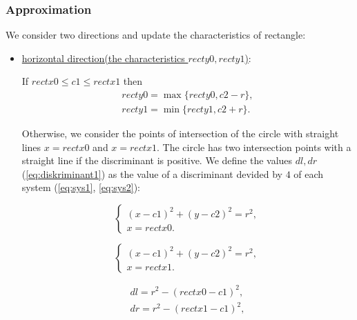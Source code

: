 \documentclass{report}
\begin{document}
\subsubsection*{Approximation}

We consider two directions and update the characteristics of rectangle:

\begin{itemize}
	
	\item \underline {horizontal direction(the characteristics $recty0, recty1$)}:
	
	If   $rectx0 \le c1\le rectx1$ then
	\begin{equation}
		\begin{gathered}
			recty0 = \max\{recty0, c2-r\},\\
			recty1 = \min\{recty1, c2+r\}.
		\end{gathered}
	\end{equation}
	
	Otherwise, we consider the points of intersection of the circle with straight lines $x = rectx0$ and $x = rectx1$. The circle has two intersection points with a straight line if the discriminant is positive. We define the values $dl, dr$ (\ref{eq:diskriminant1}) as the value of a discriminant devided by  $4$ of each system (\ref{eq:sys1}, \ref{eq:sys2}):
	
	\begin{equation}
		\begin{cases}
			(x - c1)^2 + (y - c2)^2 = r^2,\\ 
			x = rectx0.
		\end{cases}
		\label{eq:sys1}
	\end{equation}
	
	\begin{equation}
		\begin{cases}
			(x - c1)^2 + (y - c2)^2 = r^2,\\ 
			x = rectx1.
		\end{cases}
		\label{eq:sys2}
	\end{equation}
	
	\begin{equation}
		\begin{gathered}
			dl = r^2 - (rectx0 - c1)^2,\\
			dr = r^2 - (rectx1 - c1)^2,\\
			\label{eq:diskriminant1}
		\end{gathered}
	\end{equation}
	

\end{itemize}
\end{document}
